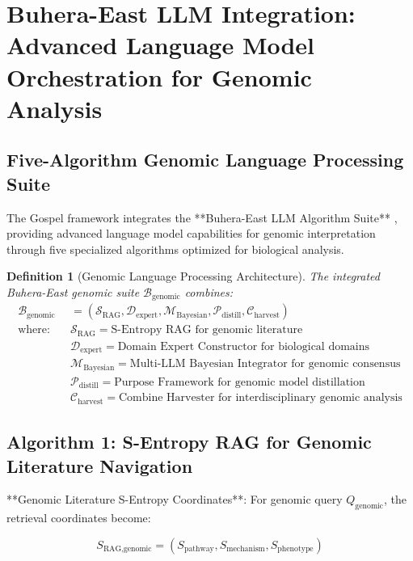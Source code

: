 \documentclass[12pt,a4paper]{article}
\newtheorem{definition}[theorem]{Definition}
\begin{document}
\section{Buhera-East LLM Integration: Advanced Language Model Orchestration for Genomic Analysis}

\subsection{Five-Algorithm Genomic Language Processing Suite}

The Gospel framework integrates the **Buhera-East LLM Algorithm Suite** \cite{sachikonye2025buhera}, providing advanced language model capabilities for genomic interpretation through five specialized algorithms optimized for biological analysis.

\begin{definition}[Genomic Language Processing Architecture]
The integrated Buhera-East genomic suite $\mathcal{B}_{\text{genomic}}$ combines:
\begin{align}
\mathcal{B}_{\text{genomic}} &= (\mathcal{S}_{\text{RAG}}, \mathcal{D}_{\text{expert}}, \mathcal{M}_{\text{Bayesian}}, \mathcal{P}_{\text{distill}}, \mathcal{C}_{\text{harvest}}) \\
\text{where:} \quad &\mathcal{S}_{\text{RAG}} = \text{S-Entropy RAG for genomic literature} \\
&\mathcal{D}_{\text{expert}} = \text{Domain Expert Constructor for biological domains} \\
&\mathcal{M}_{\text{Bayesian}} = \text{Multi-LLM Bayesian Integrator for genomic consensus} \\
&\mathcal{P}_{\text{distill}} = \text{Purpose Framework for genomic model distillation} \\
&\mathcal{C}_{\text{harvest}} = \text{Combine Harvester for interdisciplinary genomic analysis}
\end{align}
\end{definition}

\subsection{Algorithm 1: S-Entropy RAG for Genomic Literature Navigation}

**Genomic Literature S-Entropy Coordinates**: For genomic query $Q_{\text{genomic}}$, the retrieval coordinates become:

\begin{equation}
S_{\text{RAG,genomic}} = (S_{\text{pathway}}, S_{\text{mechanism}}, S_{\text{phenotype}})
\end{equation}
\end{document}
